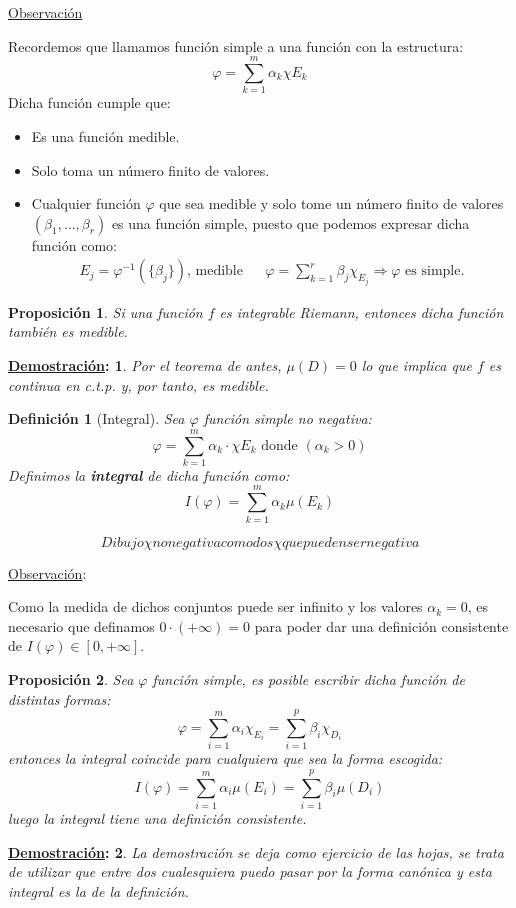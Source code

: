 \documentclass[10pt,a4paper,openright]{book}
\theoremstyle{break}
\newtheorem*{defi}{Definición}
\newtheorem*{prop}{Proposición}
\newtheorem*{demo}{\underline{Demostración}:}
\begin{document}
\underline{Observación}

Recordemos que llamamos función simple a una función con la estructura:
$$\varphi = \sum_{k=1}^{m} \alpha_k\chi{E_k}$$
Dicha función cumple que:
\begin{itemize}
    \item Es una función medible.
    \item Solo toma un número finito de valores.
    \item Cualquier función $\varphi$ que sea medible y solo tome un número finito de valores $(\beta_1, \ldots, \beta_r)$ es una función simple, puesto que podemos expresar dicha función como:
\begin{align*}
E_j = \varphi^{-1}\left(\{\beta_j\}\right) \text{, medible} & & \varphi = \sum_{k=1}^{r} \beta_j \chi_{E_j} \Rightarrow \varphi \text{ es simple.}
\end{align*}
\end{itemize}

\begin{prop}
Si una función $f$ es integrable Riemann, entonces dicha función también es medible.
\end{prop}
\begin{demo}
Por el teorema de antes, $\mu(D) = 0$ lo que implica que $f$ es continua en c.t.p. y, por tanto, es medible.
\end{demo}

\begin{defi}[Integral]
Sea $\varphi$ función simple no negativa:
$$\varphi = \sum_{k=1}^{m} \alpha_k \cdot \chi{E_k} \mbox{ donde } \left(\alpha_k > 0\right)$$
Definimos la \textbf{integral} de dicha función como:
$$I\left(\varphi\right) = \sum_{k=1}^{m} \alpha_k \mu\left(E_k\right)$$
\end{defi}
$$Dibujo \chi no negativa como dos \chi que pueden ser negativa$$ 

\underline{Observación}:

Como la medida de dichos conjuntos puede ser infinito y los valores $\alpha_k = 0$, es necesario que definamos $0 \cdot \left(+ \infty\right) = 0$ para poder dar una definición consistente de $I\left(\varphi\right) \in \left[0, +\infty\right]$.

\begin{prop}
Sea $\varphi$ función simple, es posible escribir dicha función de distintas formas:
$$\varphi = \sum_{i=1}^{m} \alpha_i \chi_{E_i} = \sum_{i=1}^{p} \beta_i \chi_{D_i}$$
entonces la integral coincide para cualquiera que sea la forma escogida:
$$I(\varphi) = \sum_{i=1}^{m} \alpha_i \mu\left(E_i\right) = \sum_{i=1}^{p} \beta_i \mu\left(D_i\right)$$
luego la integral tiene una definición consistente.
\end{prop}
\begin{demo}
La demostración se deja como ejercicio de las hojas, se trata de utilizar que entre dos cualesquiera puedo pasar por la forma canónica y esta integral es la de la definición.
\end{demo}
\end{document}
